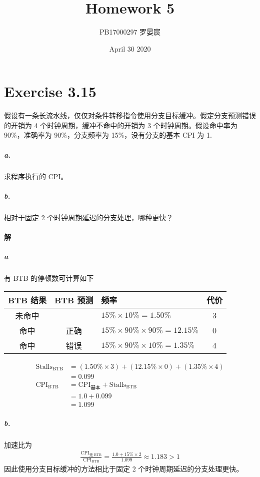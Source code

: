 \documentclass{article}
\title{Homework 5}
\author{PB17000297 罗晏宸}
\date{April 30 2020}
\begin{document}
\maketitle

\section{Exercise 3.15}
假设有一条长流水线，仅仅对条件转移指令使用分支目标缓冲。假定分支预测错误的开销为 4 个时钟周期，缓冲不命中的开销为 3 个时钟周期。假设命中率为 90\%，准确率为 90\%，分支频率为 15\%，没有分支的基本 CPI 为 1.
\subparagraph{a.} 求程序执行的 CPI。
\subparagraph{b.} 相对于固定 2 个时钟周期延迟的分支处理，哪种更快？

\paragraph{解}
\subparagraph{a}
有 BTB 的停顿数可计算如下
\begin{table}
    \centering
    \begin{tabular}{cclc}
        \toprule
        BTB 结果 & BTB 预测 & 频率                                     & 代价 \\
        \midrule
        未命中   &          & $15\% \times 10\% = 1.50\%$              & 3    \\
        命中     & 正确     & $15\% \times 90\% \times 90\% = 12.15\%$ & 0    \\
        命中     & 错误     & $15\% \times 90\% \times 10\% = 1.35\%$  & 4    \\
        \bottomrule
    \end{tabular}
\end{table}
\begin{align*}
    \text{Stalls}_{\text{BTB}} & = (1.50\% \times 3) + (12.15\% \times 0) + (1.35\% \times 4) \\
                               & = 0.099                                                      \\
    \text{CPI}_{\text{BTB}}    & = \text{CPI}_{\text{基本}} + \text{Stalls}_{\text{BTB}}      \\
                               & =1.0 + 0.099                                                 \\
                               & =1.099
\end{align*}

\subparagraph{b.}
加速比为
\begin{align*}
    \frac{\text{CPI}_{\text{无 BTB}}}{\text{CPI}_{\text{BTB}}} = \frac{1.0 + 15\% \times 2}{1.099} \approx 1.183 > 1
\end{align*}
因此使用分支目标缓冲的方法相比于固定 2 个时钟周期延迟的分支处理更快。
\end{document}
